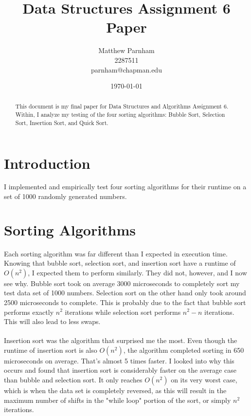 \documentclass[12pt]{article}
\title{Data Structures Assignment 6 Paper}
\author{
        Matthew Parnham \\
        2287511 \\
        parnham@chapman.edu
}
\date{\today}
\begin{document}
\maketitle

\begin{abstract}
This document is my final paper for Data Structures and Algorithms Assignment 6.
Within, I analyze my testing of the four sorting algorithms: Bubble Sort, Selection Sort, Insertion Sort, and Quick Sort.
\end{abstract}

\section{Introduction}
I implemented and empirically test four sorting algorithms for their runtime on a set of 1000 randomly generated numbers.

\section{Sorting Algorithms}
\paragraph{}
Each sorting algorithm was far different than I expected in execution time.  Knowing that bubble sort, selection sort, and insertion sort have a runtime of $O(n^{2})$, I expected them to perform similarly.  They did not, however, and I now see why.  Bubble sort took on average 3000 microseconds to completely sort my test data set of 1000 numbers.  Selection sort on the other hand only took around 2500 microseconds to complete.  This is probably due to the fact that bubble sort performs exactly $n^{2}$ iterations while selection sort performs $n^{2}-n$ iterations.  This will also lead to less swaps.

\paragraph{}
Insertion sort was the algorithm that surprised me the most. Even though the runtime of insertion sort is also $O(n^{2})$, the algorithm completed sorting in 650 microseconds on average.  That's almost 5 times faster.  I looked into why this occurs and found that insertion sort is considerably faster on the average case than bubble and selection sort.  It only reaches $O(n^{2})$ on its very worst case, which is when the data set is completely reversed, as this will result in the maximum number of shifts in the "while loop" portion of the sort, or simply $n^{2}$ iterations.
\end{document}
